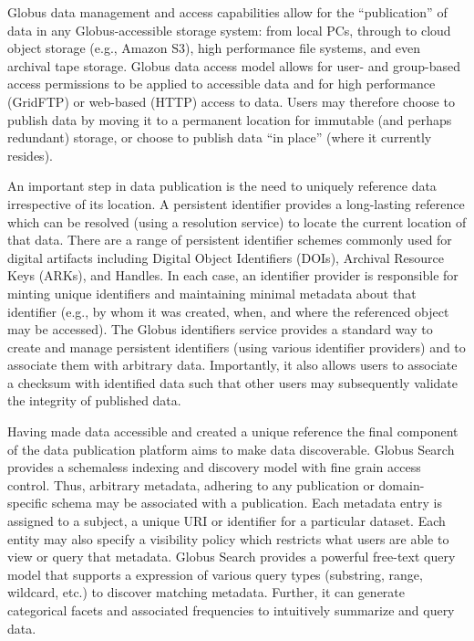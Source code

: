 \documentclass{aip-cp}
\begin{document}
Globus data management and access capabilities allow for the  ``publication''
of data in any Globus-accessible storage system:  from local PCs, through to
cloud object storage (e.g., Amazon S3), high performance file systems, and
even archival tape storage. Globus data access model allows for user- and
group-based access permissions to be applied to accessible data and for high
performance (GridFTP) or web-based (HTTP) access to data.  Users may therefore
choose to publish data by moving it to a permanent location for  immutable
(and perhaps redundant) storage, or choose to publish  data ``in place''
(where it currently resides).

An important step in data publication is the need to uniquely reference data
irrespective of its location. A persistent identifier provides a long-lasting
reference which can be  resolved (using a resolution service) to locate the
current location of that data. There are a range of persistent identifier
schemes commonly used for digital artifacts including Digital Object
Identifiers (DOIs), Archival Resource Keys (ARKs), and Handles.  In each case,
an identifier provider is responsible for minting unique identifiers and
maintaining minimal metadata about that  identifier (e.g., by whom it was
created, when, and where  the referenced object may be accessed). The Globus
identifiers service provides a standard way to create and manage persistent
identifiers (using various identifier providers) and to associate them with
arbitrary data. Importantly, it also allows users to associate a checksum with
identified data such that other users may subsequently validate the integrity
of published data.

Having made data accessible and created a unique reference the final component
of the data publication platform aims to make data discoverable. Globus Search
provides a schemaless indexing and discovery model with fine grain access
control.  Thus, arbitrary metadata, adhering to any publication or domain-
specific schema may be associated with a publication.  Each metadata entry is
assigned to a subject, a unique  URI or identifier for a particular dataset.
Each entity may also specify a visibility policy which restricts what users
are able to view or query that metadata.  Globus Search provides a powerful
free-text query model that supports a expression of various query types
(substring, range, wildcard, etc.)  to discover matching metadata. Further, it
can generate categorical facets and associated frequencies to  intuitively
summarize and query data.
\end{document}
